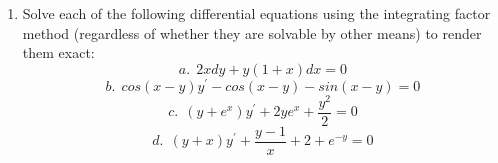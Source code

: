 \documentclass[fleqn]{article}
\begin{document}
\begin{enumerate}
    \item Solve each of the following differential equations using the integrating factor method (regardless of whether they are solvable by other means) to render them exact:
    \begin{equation*}
      a. ~~ 2xdy+y(1+x)dx=0
    \end{equation*}
    \begin{equation*}
      b. ~~ cos(x-y)y^{\prime}-cos(x-y)-sin(x-y)=0
    \end{equation*}
    \begin{equation*}
      c. ~~  (y+e^x)y^{\prime}+2ye^x+\dfrac{y^2}{2}=0
    \end{equation*}
    \begin{equation*}
      d. ~~ (y+x)y^{\prime}+\dfrac{y-1}{x}+2+e^{-y}=0
    \end{equation*}
  \end{enumerate}
\end{document}

